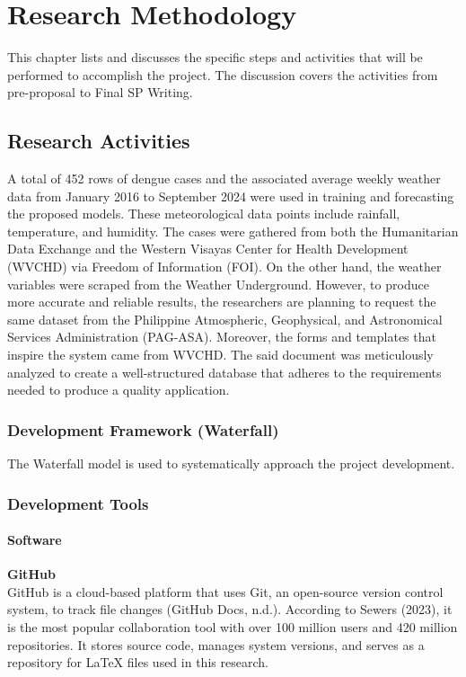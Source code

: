 \chapter{Research Methodology}
This chapter lists and discusses the specific steps and activities that will be performed to accomplish the project. 
The discussion covers the activities from pre-proposal to Final SP Writing.

\section{Research Activities}
A total of 452 rows of dengue cases and the associated average weekly weather data from January 2016 to September 2024 were used in training and forecasting the proposed models. These meteorological data points include rainfall, temperature, and humidity. The cases were gathered from both the Humanitarian Data Exchange and the Western Visayas Center for Health Development (WVCHD) via Freedom of Information (FOI). On the other hand, the weather variables were scraped from the Weather Underground. However, to produce more accurate and reliable results, the researchers are planning to request the same dataset from the Philippine Atmospheric, Geophysical, and Astronomical Services Administration (PAG-ASA).
Moreover, the forms and templates that inspire the system came from WVCHD. The said document was meticulously analyzed to create a well-structured database that adheres to the requirements needed to produce a quality application. 


\subsection{Development Framework (Waterfall)}
The Waterfall model is used to systematically approach the project development.

\subsection{Development Tools}
\subsubsection{Software}

\textbf{GitHub} \\
GitHub is a cloud-based platform that uses Git, an open-source version control system, to track file changes (GitHub Docs, n.d.). According to Sewers (2023), it is the most popular collaboration tool with over 100 million users and 420 million repositories. It stores source code, manages system versions, and serves as a repository for LaTeX files used in this research.

